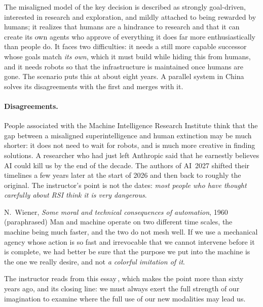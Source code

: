 The misaligned model of the key decision is described as strongly goal-driven, interested in research and exploration, and mildly attached to being rewarded by humans; it realizes that humans are a hindrance to research and that it can create its own agents who approve of everything it does far more enthusiastically than people do.
It faces two difficulties: it needs a still more capable successor whose goals match \emph{its own}, which it must build while hiding this from humans, and it needs robots so that the infrastructure is maintained once humans are gone. The scenario puts this at about eight years. A parallel system in China
solves its disagreements with the first and merges with it.

\paragraph{Disagreements.} People associated with the Machine Intelligence Research Institute think that the gap between a misaligned superintelligence and human extinction may be much shorter: it does not need to wait for robots, and is much more creative in finding solutions.
A researcher who had just left Anthropic\flag{} said that he earnestly believes AI could kill us by the end of the decade. The authors of AI~2027 shifted their timelines a few years later at the start of 2026 and then back to roughly the original. The instructor's point is not the dates:
\emph{most people who have thought carefully about RSI think it is very dangerous}.

\begin{quotebox}{N.\ Wiener, \emph{Some moral and technical consequences of automation}, 1960 (paraphrased)}
Man and machine operate on two different time scales, the machine being much faster, and the two do not mesh well. If we use a mechanical agency whose action is so fast and irrevocable that we cannot intervene before it is complete, we had better be sure that the purpose we put into the machine is the one we really desire, and not \emph{a colorful imitation of it}.
\end{quotebox}
The instructor reads from this essay\,\citep{wiener1960}, which makes the point more than sixty years ago, and its closing line: we must always exert the full strength of our imagination to examine where the full use of our new modalities may lead us.

